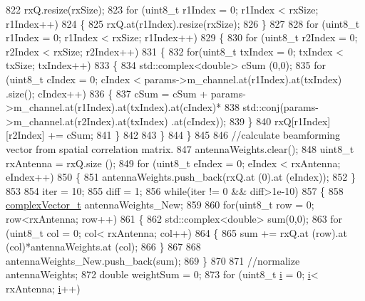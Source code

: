 \begin{DoxyCode}
822         rxQ.resize(rxSize);
823         \textcolor{keywordflow}{for} (uint8\_t r1Index = 0; r1Index < rxSize; r1Index++)
824         \{
825                 rxQ.at(r1Index).resize(rxSize);
826         \}
827 
828         \textcolor{keywordflow}{for} (uint8\_t r1Index = 0; r1Index < rxSize; r1Index++)
829         \{
830                 \textcolor{keywordflow}{for} (uint8\_t r2Index = 0; r2Index < rxSize; r2Index++)
831                 \{
832                         \textcolor{keywordflow}{for}(uint8\_t txIndex = 0; txIndex < txSize; txIndex++)
833             \{
834                                 std::complex<double> cSum (0,0);
835                                 \textcolor{keywordflow}{for} (uint8\_t cIndex = 0; cIndex < params->m\_channel.at(r1Index).at(txIndex)
      .size(); cIndex++)
836                                 \{
837                                         cSum = cSum + params->m\_channel.at(r1Index).at(txIndex).at(cIndex)*
838                                                         std::conj(params->m\_channel.at(r2Index).at(txIndex)
      .at(cIndex));
839                                 \}
840                                 rxQ[r1Index][r2Index] += cSum;
841             \}
842 
843                 \}
844         \}
845 
846         \textcolor{comment}{//calculate beamforming vector from spatial correlation matrix.}
847         antennaWeights.clear();
848         uint8\_t rxAntenna = rxQ.size ();
849         \textcolor{keywordflow}{for} (uint8\_t eIndex = 0; eIndex < rxAntenna; eIndex++)
850         \{
851                 antennaWeights.push\_back(rxQ.at (0).at (eIndex));
852         \}
853 
854         iter = 10;
855         diff = 1;
856         \textcolor{keywordflow}{while}(iter != 0 && diff>1e-10)
857         \{
858                 \hyperlink{namespacens3_a6a7f75817ae50e6ac47414955b17d926}{complexVector\_t} antennaWeights\_New;
859 
860                 \textcolor{keywordflow}{for}(uint8\_t row = 0; row<rxAntenna; row++)
861                 \{
862                         std::complex<double> sum(0,0);
863                         \textcolor{keywordflow}{for} (uint8\_t col = 0; col< rxAntenna; col++)
864                         \{
865                                 sum += rxQ.at (row).at (col)*antennaWeights.at (col);
866                         \}
867 
868                     antennaWeights\_New.push\_back(sum);
869                 \}
870 
871                 \textcolor{comment}{//normalize antennaWeights;}
872                 \textcolor{keywordtype}{double} weightSum = 0;
873                 \textcolor{keywordflow}{for} (uint8\_t \hyperlink{bernuolliDistribution_8m_a6f6ccfcf58b31cb6412107d9d5281426}{i} = 0; \hyperlink{bernuolliDistribution_8m_a6f6ccfcf58b31cb6412107d9d5281426}{i}< rxAntenna; \hyperlink{bernuolliDistribution_8m_a6f6ccfcf58b31cb6412107d9d5281426}{i}++)

\end{DoxyCode}
